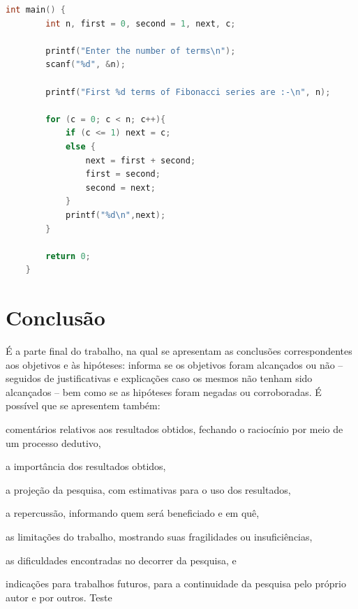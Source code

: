\documentclass[12pt,oneside,a4paper,chapter=TITLE,section=TITLE,sumario
=tradicional]{abntex2}
\begin{document}
\begin{codigo}[htb]
    \begin{lstlisting}[language=C]
    int main() {
        int n, first = 0, second = 1, next, c;
        
        printf("Enter the number of terms\n");
        scanf("%d", &n);
        
        printf("First %d terms of Fibonacci series are :-\n", n);
        
        for (c = 0; c < n; c++){
            if (c <= 1) next = c;
            else {
                next = first + second;
                first = second;
                second = next;
            }
            printf("%d\n",next);
        }
        
        return 0;
    }
    \end{lstlisting}
    
    \fonteautor
\end{codigo}


\chapter{Conclusão}

É a parte final do trabalho, na qual se apresentam as conclusões 
correspondentes aos objetivos e às hipóteses: informa se os objetivos foram 
alcançados ou não – seguidos de justificativas e explicações caso os mesmos não 
tenham sido alcançados – bem como se as hipóteses foram negadas ou 
corroboradas. É possível que se apresentem também:

\begin{lista}
    \item comentários relativos aos resultados obtidos, fechando o raciocínio 
    por meio de um processo dedutivo,
    
    \item a importância dos resultados obtidos,
    
    \item a projeção da pesquisa, com estimativas para o uso dos resultados,
    
    \item a repercussão, informando quem será beneficiado e em quê,
    
    \item as limitações do trabalho, mostrando suas fragilidades ou
insuficiências,
    \item as dificuldades encontradas no decorrer da pesquisa, e
    \item indicações para trabalhos futuros, para a continuidade da
pesquisa pelo próprio autor e por outros. Teste
\end{lista}
\end{document}
